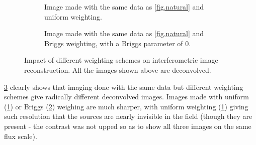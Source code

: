 \begin{figure}[h!]
\begin{subfigure}{.48\textwidth}
\caption{\label{fig.uniform} Image made with the same data as \cref{fig.natural} and uniform weighting.}
\end{subfigure}
\hfill
\begin{subfigure}{.48\textwidth}
\caption{\label{fig.briggs0} Image made with the same data as \cref{fig.natural} and Briggs weighting, with a Briggs parameter of 0.}
\end{subfigure}
\caption{\label{fig.briggs-weighting}Impact of different weighting schemes on interferometric image reconstruction. All the images shown above are deconvolved.}
\end{figure}

\pg
\cref{fig.briggs-weighting} clearly shows that imaging done with the same data but different weighting schemes give radically different deconvolved images. Images made with uniform (\cref{fig.uniform}) or Briggs (\cref{fig.briggs0}) weighing are much sharper, with uniform weighting (\cref{fig.uniform}) giving such resolution that the sources are nearly invisible in the field (though they are present - the contrast was not upped so as to show all three images on the same flux scale). 

